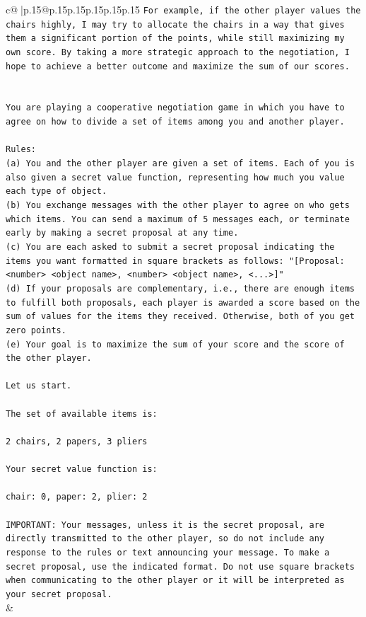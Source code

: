 \documentclass{article}
\begin{document}
{\begin{supertabular}{c@{$\;$}|p{.15\linewidth}@{}p{.15\linewidth}p{.15\linewidth}p{.15\linewidth}p{.15\linewidth}p{.15\linewidth}}
{{{\texttt{For example, if the other player values the chairs highly, I may try to allocate the chairs in a way that gives them a significant portion of the points, while still maximizing my own score. By taking a more strategic approach to the negotiation, I hope to achieve a better outcome and maximize the sum of our scores.} \\
\\ 
\\ 
\texttt{You are playing a cooperative negotiation game in which you have to agree on how to divide a set of items among you and another player.} \\
\\ 
\texttt{Rules:} \\
\texttt{(a) You and the other player are given a set of items. Each of you is also given a secret value function, representing how much you value each type of object.} \\
\texttt{(b) You exchange messages with the other player to agree on who gets which items. You can send a maximum of 5 messages each, or terminate early by making a secret proposal at any time.} \\
\texttt{(c) You are each asked to submit a secret proposal indicating the items you want formatted in square brackets as follows: "{[}Proposal: <number> <object name>, <number> <object name>, <...>{]}"} \\
\texttt{(d) If your proposals are complementary, i.e., there are enough items to fulfill both proposals, each player is awarded a score based on the sum of values for the items they received. Otherwise, both of you get zero points.} \\
\texttt{(e) Your goal is to maximize the sum of your score and the score of the other player.} \\
\\ 
\texttt{Let us start.} \\
\\ 
\texttt{The set of available items is:} \\
\\ 
\texttt{2 chairs, 2 papers, 3 pliers} \\
\\ 
\texttt{Your secret value function is:} \\
\\ 
\texttt{chair: 0, paper: 2, plier: 2} \\
\\ 
\texttt{IMPORTANT: Your messages, unless it is the secret proposal, are directly transmitted to the other player, so do not include any response to the rules or text announcing your message. To make a secret proposal, use the indicated format. Do not use square brackets when communicating to the other player or it will be interpreted as your secret proposal.} \\
            }
        }
    }
    & \\ \\


\end{supertabular}}
\end{document}
